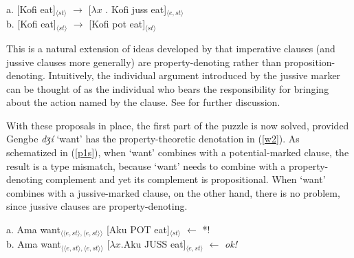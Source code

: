 \documentclass[output=paper
,modfonts
,nonflat]{langsci/langscibook}
\newcommand{\Z}{ʒ}
\newcommand{\á}{\'{ã}}
\newcommand{\É}{\'{\~{ε}}}
\newcommand{\È}{\`{\~{ε}}}
\newcommand{\í}{\'{\~{i}}}
\newcommand{\ì}{\`{\~{i}}}
\newcommand{\Ó}{\'{\~{ɔ}}}
\newcommand{\Ò}{\`{\~{ɔ}}}
\newcommand{\ú}{\'{ũ}}
\newcommand{\ù}{\`{ũ}}
\begin{document}
\ea
a. [Kofi eat]$_{\langle st\rangle}$ $\rightarrow$ [$\lambda x$ . Kofi {\sc juss} eat]$_{\langle e,st\rangle}$\\
b. [Kofi eat]$_{\langle st\rangle}$ $\rightarrow$ [Kofi {\sc pot} eat]$_{\langle st\rangle}$ \label{mm}
\z

This is a natural extension of ideas developed by \cite{portner04, portner07, zpp12} that imperative clauses (and jussive clauses more generally) are property-denoting rather than proposition-denoting. Intuitively, the individual argument introduced by the jussive marker can be thought of as the individual who bears the responsibility for bringing about the action named by the clause.  See \citealt{gl17} for further discussion.



With these proposals in place, the first part of the puzzle is now solved, provided Gengbe {\em d{\Z}\'i} `want' has the property-theoretic denotation in (\ref{w2}). As schematized in (\ref{p1s}), when `want' combines with a potential-marked clause, the result is a type mismatch, because `want' needs to combine with a property-denoting complement and yet its complement is propositional. When `want' combines with a jussive-marked clause, on the other hand, there is no problem, since jussive clauses are property-denoting.


\ea
a. Ama want$_{\langle\langle e,st\rangle,\langle e,st\rangle\rangle}$ [Aku POT eat]$_{\langle st\rangle}$  \hfill $\leftarrow$ *!\\
b. Ama want$_{\langle\langle e,st\rangle,\langle e,st\rangle\rangle}$ [$\lambda x$.Aku JUSS eat]$_{\langle e,st\rangle}$   \hfill $\leftarrow$ {\em ok!} \label{p1s}
\z
\end{document}
